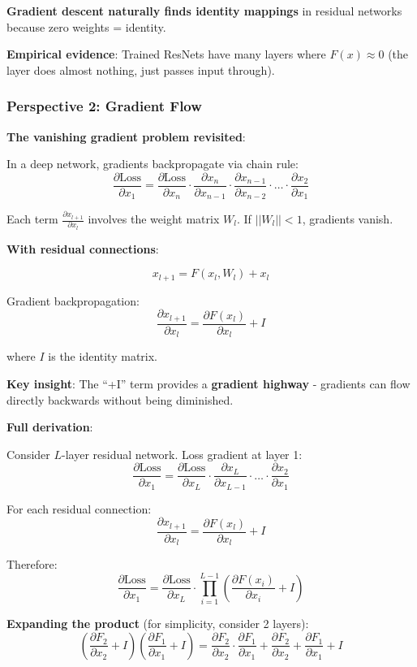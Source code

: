 \documentclass[11pt,oneside]{book}
\begin{document}
\textbf{Gradient descent naturally finds identity mappings} in residual networks because zero weights = identity.

\textbf{Empirical evidence}: Trained ResNets have many layers where $F(x) \approx 0$ (the layer does almost nothing, just passes input through).

\subsubsection{Perspective 2: Gradient Flow}

\textbf{The vanishing gradient problem revisited}:

In a deep network, gradients backpropagate via chain rule:
\[
\frac{\partial \text{Loss}}{\partial x_1} = \frac{\partial \text{Loss}}{\partial x_n} \cdot \frac{\partial x_n}{\partial x_{n-1}} \cdot \frac{\partial x_{n-1}}{\partial x_{n-2}} \cdot \ldots \cdot \frac{\partial x_2}{\partial x_1}
\]

Each term $\frac{\partial x_{l+1}}{\partial x_l}$ involves the weight matrix $W_l$. If $||W_l|| < 1$, gradients vanish.

\textbf{With residual connections}:

\[
x_{l+1} = F(x_l, W_l) + x_l
\]

Gradient backpropagation:
\[
\frac{\partial x_{l+1}}{\partial x_l} = \frac{\partial F(x_l)}{\partial x_l} + I
\]

where $I$ is the identity matrix.

\textbf{Key insight}: The ``+I'' term provides a \textbf{gradient highway} - gradients can flow directly backwards without being diminished.

\textbf{Full derivation}:

Consider $L$-layer residual network. Loss gradient at layer 1:
\[
\frac{\partial \text{Loss}}{\partial x_1} = \frac{\partial \text{Loss}}{\partial x_L} \cdot \frac{\partial x_L}{\partial x_{L-1}} \cdot \ldots \cdot \frac{\partial x_2}{\partial x_1}
\]

For each residual connection:
\[
\frac{\partial x_{l+1}}{\partial x_l} = \frac{\partial F(x_l)}{\partial x_l} + I
\]

Therefore:
\[
\frac{\partial \text{Loss}}{\partial x_1} = \frac{\partial \text{Loss}}{\partial x_L} \cdot \prod_{i=1}^{L-1} \left(\frac{\partial F(x_i)}{\partial x_i} + I\right)
\]

\textbf{Expanding the product} (for simplicity, consider 2 layers):
\[
\left(\frac{\partial F_2}{\partial x_2} + I\right)\left(\frac{\partial F_1}{\partial x_1} + I\right) = \frac{\partial F_2}{\partial x_2} \cdot \frac{\partial F_1}{\partial x_1} + \frac{\partial F_2}{\partial x_2} + \frac{\partial F_1}{\partial x_1} + I
\]
\end{document}
